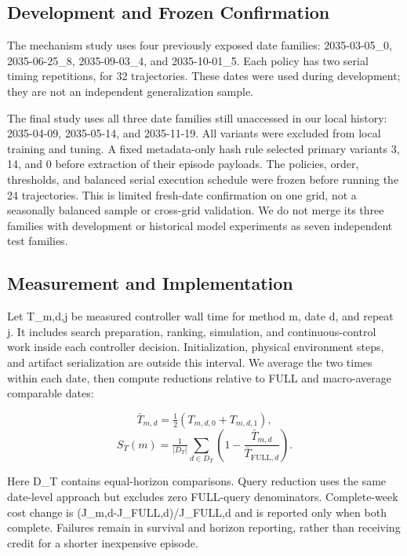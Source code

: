 \documentclass[letterpaper]{article}
\begin{document}
\subsection{Development and Frozen Confirmation}

The mechanism study uses four previously exposed date families: 2035-03-05\_0, 2035-06-25\_8, 2035-09-03\_4, and 2035-10-01\_5. Each policy has two serial timing repetitions, for 32 trajectories. These dates were used during development; they are not an independent generalization sample.


The final study uses all three date families still unaccessed in our local history: 2035-04-09, 2035-05-14, and 2035-11-19. All variants were excluded from local training and tuning. A fixed metadata-only hash rule selected primary variants 3, 14, and 0 before extraction of their episode payloads. The policies, order, thresholds, and balanced serial execution schedule were frozen before running the 24 trajectories. This is limited fresh-date confirmation on one grid, not a seasonally balanced sample or cross-grid validation. We do not merge its three families with development or historical model experiments as seven independent test families.


\subsection{Measurement and Implementation}

Let T\_m,d,j be measured controller wall time for method m, date d, and repeat j. It includes search preparation, ranking, simulation, and continuous-control work inside each controller decision. Initialization, physical environment steps, and artifact serialization are outside this interval. We average the two times within each date, then compute reductions relative to FULL and macro-average comparable dates:


\begin{equation}
\bar T_{m,d}=\tfrac12(T_{m,d,0}+T_{m,d,1}),
\end{equation}
\begin{equation}
S_T(m)=\tfrac1{|D_T|}\sum_{d\in D_T}\left(1-\frac{\bar T_{m,d}}{\bar T_{\mathrm{FULL},d}}\right).
\end{equation}

Here D\_T contains equal-horizon comparisons. Query reduction uses the same date-level approach but excludes zero FULL-query denominators. Complete-week cost change is (J\_m,d-J\_FULL,d)/J\_FULL,d and is reported only when both complete. Failures remain in survival and horizon reporting, rather than receiving credit for a shorter inexpensive episode.
\end{document}
